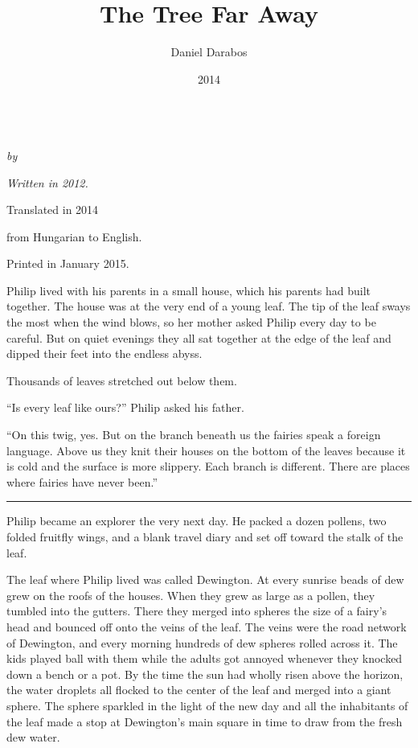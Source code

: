 \documentclass[10pt, draft]{memoir}
\author{Daniel Darabos}
\date{2014}
\title{The Tree Far Away}
\renewcommand{\pfbreakdisplay}{\bigskip \ding{166} \bigskip}
\newcommand{\secbreak}{\fancybreak{\pfbreakdisplay}}
\begin{document}
\begin{titlingpage}
  \centering
  \vspace*{0.2\textheight}
  {\Huge \thetitle}\\[\baselineskip]
  {\large\itshape by \theauthor}\\[\baselineskip]
  \vfill
  {\itshape Written in 2012. \par
  Translated in 2014 \par from Hungarian to English. \par
  Printed in January 2015.}
  \vspace*{0.1\textheight}
\end{titlingpage}

\noindent
Philip lived with his parents in a small house, which his parents had built
together. The house was at the very end of a young leaf. The tip of the leaf
sways the most when the wind blows, so her mother asked Philip every day to be
careful. But on quiet evenings they all sat together at the edge of the leaf
and dipped their feet into the endless abyss.

Thousands of leaves stretched out below them.

``Is every leaf like ours?'' Philip asked his father.

``On this twig, yes. But on the branch beneath us the fairies speak a foreign
language. Above us they knit their houses on the bottom of the leaves because
it is cold and the surface is more slippery. Each branch is different. There
are places where fairies have never been.''

\secbreak

Philip became an explorer the very next day. He packed a dozen pollens, two
folded fruitfly wings, and a blank travel diary and set off toward the stalk of
the leaf.

The leaf where Philip lived was called Dewington. At every sunrise beads of dew
grew on the roofs of the houses. When they grew as large as a pollen, they
tumbled into the gutters. There they merged into spheres the size of a fairy's
head and bounced off onto the veins of the leaf. The veins were the road
network of Dewington, and every morning hundreds of dew spheres rolled across
it. The kids played ball with them while the adults got annoyed whenever they
knocked down a bench or a pot. By the time the sun had wholly risen above the
horizon, the water droplets all flocked to the center of the leaf and merged
into a giant sphere. The sphere sparkled in the light of the new day and all
the inhabitants of the leaf made a stop at Dewington's main square in time to
draw from the fresh dew water.
\end{document}
